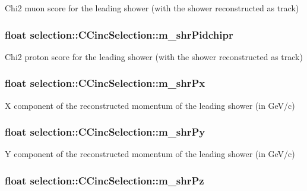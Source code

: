 Chi2 muon score for the leading shower (with the shower reconstructed as track) \hypertarget{classselection_1_1CCincSelection_a23975eb02710fef71c363a9dd8ed808b}{
\subsubsection[{m\-\_\-shr\-Pidchipr}]{\setlength{\rightskip}{0pt plus 5cm}float selection\-::\-C\-Cinc\-Selection\-::m\-\_\-shr\-Pidchipr\hspace{0.3cm}{\ttfamily [private]}}}\label{classselection_1_1CCincSelection_a23975eb02710fef71c363a9dd8ed808b}
Chi2 proton score for the leading shower (with the shower reconstructed as track) \hypertarget{classselection_1_1CCincSelection_a9a4858dd265bafd929aca940a2bc1342}{
\subsubsection[{m\-\_\-shr\-Px}]{\setlength{\rightskip}{0pt plus 5cm}float selection\-::\-C\-Cinc\-Selection\-::m\-\_\-shr\-Px\hspace{0.3cm}{\ttfamily [private]}}}\label{classselection_1_1CCincSelection_a9a4858dd265bafd929aca940a2bc1342}
X component of the reconstructed momentum of the leading shower (in Ge\-V/c) \hypertarget{classselection_1_1CCincSelection_af38a589c58d27b98779c05fe6ad078c7}{
\subsubsection[{m\-\_\-shr\-Py}]{\setlength{\rightskip}{0pt plus 5cm}float selection\-::\-C\-Cinc\-Selection\-::m\-\_\-shr\-Py\hspace{0.3cm}{\ttfamily [private]}}}\label{classselection_1_1CCincSelection_af38a589c58d27b98779c05fe6ad078c7}
Y component of the reconstructed momentum of the leading shower (in Ge\-V/c) \hypertarget{classselection_1_1CCincSelection_a8379b0c7d0b8a8d0b62ff0b353505146}{
\subsubsection[{m\-\_\-shr\-Pz}]{\setlength{\rightskip}{0pt plus 5cm}float selection\-::\-C\-Cinc\-Selection\-::m\-\_\-shr\-Pz\hspace{0.3cm}{\ttfamily [private]}}}\label{classselection_1_1CCincSelection_a8379b0c7d0b8a8d0b62ff0b353505146}
